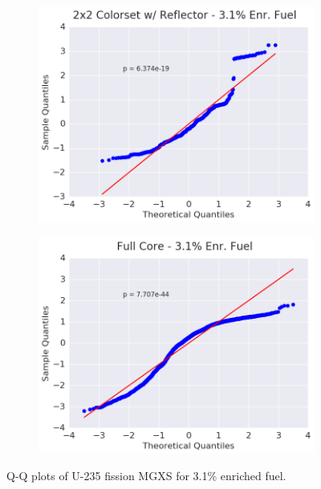 \begin{figure}[h!]
\begin{subfigure}{0.5\textwidth}
  \includegraphics[width=\linewidth]{figures/patterns/reflector/quantile/31-enr-fiss-2}  \caption{}
  \label{fig:chap9-qq-reflector-3.1-fiss}
\end{subfigure}%
\begin{subfigure}{0.5\textwidth}
  \centering
  \includegraphics[width=\linewidth]{figures/patterns/full-core/quantile/31-enr-fiss-2} \caption{}
  \label{fig:chap9-qq-full-core-3.1-fiss}
\end{subfigure}
\caption[Q-Q plots of U-235 fission MGXS 3.1\% enriched fuel]{Q-Q plots of U-235 fission \ac{MGXS} for 3.1\% enriched fuel.}
\label{fig:chap9-qq-3.1-fiss}
\end{figure}


